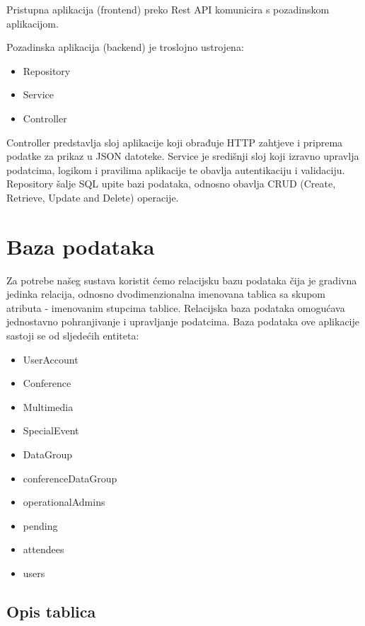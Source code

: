 		Pristupna aplikacija (frontend) preko Rest API komunicira s pozadinskom aplikacijom.
		
		Pozadinska aplikacija (backend) je troslojno ustrojena:
		\begin{itemize}
		\item Repository
		\item Service
		\item Controller
		\end{itemize}
		Controller predstavlja sloj aplikacije koji obrađuje HTTP zahtjeve i priprema podatke za prikaz u JSON datoteke.
		Service je središnji sloj koji izravno upravlja podatcima, logikom i pravilima aplikacije te obavlja autentikaciju i validaciju.
		Repository šalje SQL upite bazi podataka, odnosno obavlja CRUD (Create, Retrieve, Update and Delete) operacije.
		

				
		\section{Baza podataka}
			
			
			
		Za potrebe našeg sustava koristit ćemo relacijsku bazu podataka čija je gradivna jedinka relacija, odnosno dvodimenzionalna imenovana tablica sa skupom atributa - imenovanim stupcima tablice. Relacijska baza podataka omogućava jednostavno pohranjivanje i upravljanje podatcima. Baza podataka ove aplikacije sastoji se od sljedećih entiteta:
		
		\begin{itemize}
		    \item   UserAccount
		    \item   Conference
		    \item   Multimedia
		    \item   SpecialEvent
		    \item   DataGroup
		    \item   conferenceDataGroup
		    \item   operationalAdmins
		    \item   pending
		    \item   attendees
                \item   users
		\end{itemize}

		
			\subsection{Opis tablica}
			

